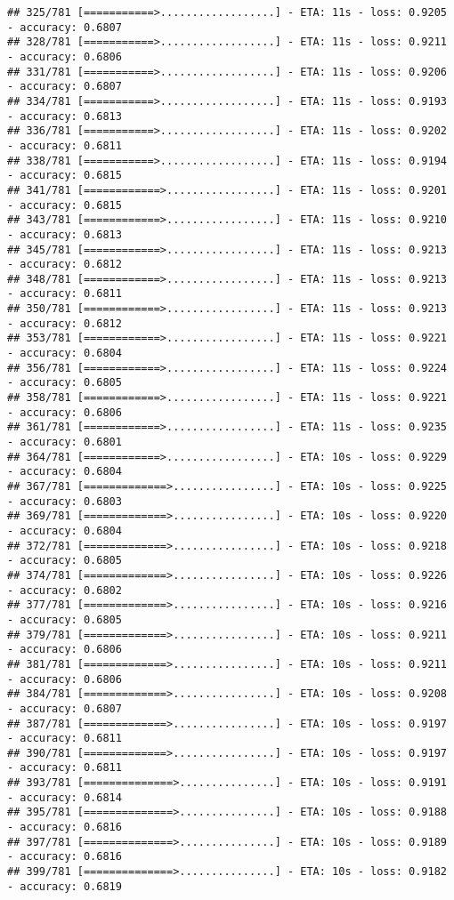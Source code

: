 \documentclass[
]{article}
\begin{document}
\begin{verbatim}
## 325/781 [===========>..................] - ETA: 11s - loss: 0.9205 - accuracy: 0.6807
## 328/781 [===========>..................] - ETA: 11s - loss: 0.9211 - accuracy: 0.6806
## 331/781 [===========>..................] - ETA: 11s - loss: 0.9206 - accuracy: 0.6807
## 334/781 [===========>..................] - ETA: 11s - loss: 0.9193 - accuracy: 0.6813
## 336/781 [===========>..................] - ETA: 11s - loss: 0.9202 - accuracy: 0.6811
## 338/781 [===========>..................] - ETA: 11s - loss: 0.9194 - accuracy: 0.6815
## 341/781 [============>.................] - ETA: 11s - loss: 0.9201 - accuracy: 0.6815
## 343/781 [============>.................] - ETA: 11s - loss: 0.9210 - accuracy: 0.6813
## 345/781 [============>.................] - ETA: 11s - loss: 0.9213 - accuracy: 0.6812
## 348/781 [============>.................] - ETA: 11s - loss: 0.9213 - accuracy: 0.6811
## 350/781 [============>.................] - ETA: 11s - loss: 0.9213 - accuracy: 0.6812
## 353/781 [============>.................] - ETA: 11s - loss: 0.9221 - accuracy: 0.6804
## 356/781 [============>.................] - ETA: 11s - loss: 0.9224 - accuracy: 0.6805
## 358/781 [============>.................] - ETA: 11s - loss: 0.9221 - accuracy: 0.6806
## 361/781 [============>.................] - ETA: 11s - loss: 0.9235 - accuracy: 0.6801
## 364/781 [============>.................] - ETA: 10s - loss: 0.9229 - accuracy: 0.6804
## 367/781 [=============>................] - ETA: 10s - loss: 0.9225 - accuracy: 0.6803
## 369/781 [=============>................] - ETA: 10s - loss: 0.9220 - accuracy: 0.6804
## 372/781 [=============>................] - ETA: 10s - loss: 0.9218 - accuracy: 0.6805
## 374/781 [=============>................] - ETA: 10s - loss: 0.9226 - accuracy: 0.6802
## 377/781 [=============>................] - ETA: 10s - loss: 0.9216 - accuracy: 0.6805
## 379/781 [=============>................] - ETA: 10s - loss: 0.9211 - accuracy: 0.6806
## 381/781 [=============>................] - ETA: 10s - loss: 0.9211 - accuracy: 0.6806
## 384/781 [=============>................] - ETA: 10s - loss: 0.9208 - accuracy: 0.6807
## 387/781 [=============>................] - ETA: 10s - loss: 0.9197 - accuracy: 0.6811
## 390/781 [=============>................] - ETA: 10s - loss: 0.9197 - accuracy: 0.6811
## 393/781 [==============>...............] - ETA: 10s - loss: 0.9191 - accuracy: 0.6814
## 395/781 [==============>...............] - ETA: 10s - loss: 0.9188 - accuracy: 0.6816
## 397/781 [==============>...............] - ETA: 10s - loss: 0.9189 - accuracy: 0.6816
## 399/781 [==============>...............] - ETA: 10s - loss: 0.9182 - accuracy: 0.6819

\end{verbatim}
\end{document}
